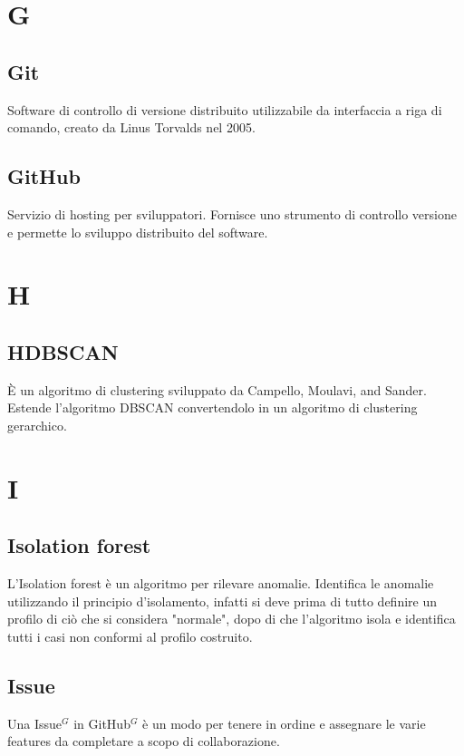\newpage
\section{G}
\subsection{Git}
Software di controllo di versione distribuito utilizzabile da interfaccia a riga di comando, creato da Linus Torvalds nel 2005.

\subsection{GitHub}
Servizio di hosting per sviluppatori. Fornisce uno strumento di controllo versione e permette lo sviluppo distribuito del software.

\newpage
\section{H}
\subsection{HDBSCAN}
È un algoritmo di clustering sviluppato da Campello, Moulavi, and Sander. Estende l'algoritmo DBSCAN convertendolo in un algoritmo di clustering gerarchico.

\newpage
\section{I}
\subsection{Isolation forest}
L'Isolation forest è un algoritmo per rilevare anomalie. Identifica le anomalie utilizzando il principio d'isolamento, infatti si deve prima di tutto definire un profilo di ciò che si considera "normale", dopo di che l'algoritmo isola e identifica tutti i casi non conformi al profilo costruito. 

\subsection{Issue}
Una Issue$^{G}$ in GitHub$^{G}$ è un modo per tenere in ordine e assegnare le varie features da completare a scopo di collaborazione.

